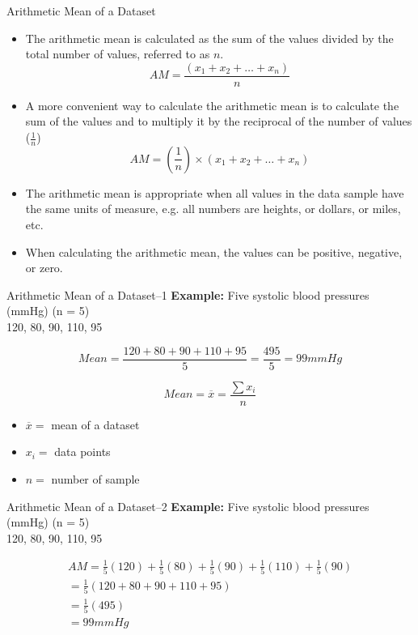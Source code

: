 \documentclass[10pt,dvipsnames, aspectratio=169]{beamer}
\begin{document}
\begin{frame}[t]{Arithmetic Mean of a Dataset}
	\begin{itemize}
		\item The arithmetic mean is calculated as the sum of the values 
		divided by the total number of values, referred to as $n$.\\ 
		$$AM =  \frac{(x_1 + x_2 + … + x_n)}{n} $$
		
		\item A more convenient way to calculate the arithmetic mean is to 
		calculate the sum of the values and to multiply it by the reciprocal of 
		the number of values ($\frac{1}{n}$) \\ 
		$$ AM = (\frac{1}{n}) \times (x_1 + x_2 + … + x_n) $$
		\item The arithmetic mean is appropriate when all values in the data 
		sample have the same units of measure, e.g. all numbers are heights, or 
		dollars, or miles, etc.
		\item When calculating the arithmetic mean, the values can be positive, 
		negative, or zero.
	\end{itemize}
\end{frame}

\begin{frame}[t]{Arithmetic Mean of a Dataset--1}
	\textbf{Example:} Five systolic blood pressures (mmHg) (n = 5) \\ 
	120, 80, 90, 110, 95
	
	$$
	Mean = 
	\frac{120+80+90+110+95}{5}
	= \frac{495}{5}
	= 99mmHg 
	$$
	
	$$
	Mean = \overline{x}  = \frac{\sum x_i }{n}
	$$
	
	\begin{itemize}
		\item $	\overline{x} = $ mean of a dataset
		\item $	x_i =$ data points 
		\item $	n =$ number of sample 
	\end{itemize}
\end{frame}

\begin{frame}[t]{Arithmetic Mean of a Dataset--2}
	\textbf{Example:} Five systolic blood pressures (mmHg) (n = 5) \\ 
	120, 80, 90, 110, 95
	
	\[
	\begin{array}{l}
	AM=	\frac{1}{5}(120)+\frac{1}{5}(80)+\frac{1}{5}(90)+\frac{1}{5}(110)+
	\frac{1}{5}(90) \\ 
	= \frac{1}{5}(120+80+90+110+95) \\ 
	= \frac{1}{5}(495) \\ 
	= 99mmHg
	\end{array}
	\]
	
\end{frame}
\end{document}
